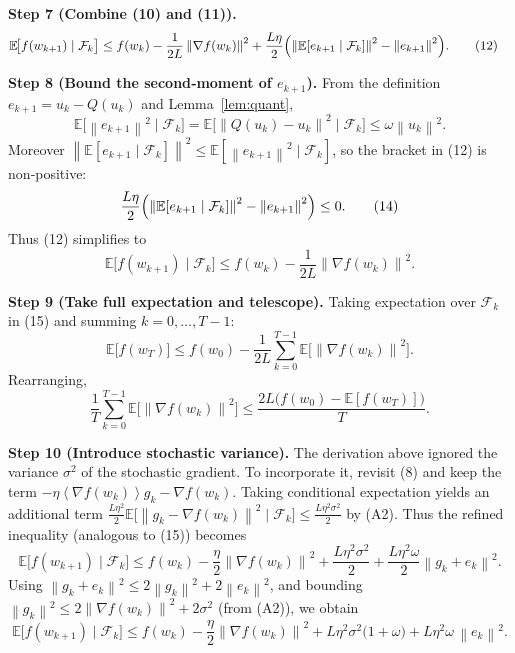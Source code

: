 \documentclass{article}
\newcommand{\E}{\mathbb{E}}
\newcommand{\norm}[1]{\left\|#1\right\|}
\newcommand{\inner}[1]{\left\langle#1\right\rangle}
\begin{document}
\bigskip
\noindent\textbf{Step 7 (Combine (10) and (11)).}
\begin{align}
\E\!\bigl[f(w_{k+1})\mid\mathcal{F}_k\bigr]
&\le f(w_k)
   -\frac{1}{2L}\norm{\nabla f(w_k)}^{2}
   +\frac{L\eta}{2}\Bigl(\norm{\E[e_{k+1}\mid\mathcal{F}_k]}^{2}
                         -\norm{e_{k+1}}^{2}\Bigr). \tag{12}
\end{align}
\noindent[Step 7]

\bigskip
\noindent\textbf{Step 8 (Bound the second‑moment of $e_{k+1}$).}  
From the definition $e_{k+1}=u_k-Q(u_k)$ and Lemma~\ref{lem:quant},
\[
\E\!\bigl[\norm{e_{k+1}}^{2}\mid\mathcal{F}_k\bigr]
   =\E\!\bigl[\norm{Q(u_k)-u_k}^{2}\mid\mathcal{F}_k\bigr]
   \le \omega\norm{u_k}^{2}. \tag{13}
\]
Moreover $\norm{\E[e_{k+1}\mid\mathcal{F}_k]}^{2}\le \E[\norm{e_{k+1}}^{2}\mid\mathcal{F}_k]$,
so the bracket in (12) is non‑positive:
\[
\frac{L\eta}{2}\Bigl(\norm{\E[e_{k+1}\mid\mathcal{F}_k]}^{2}
                         -\norm{e_{k+1}}^{2}\Bigr)
\le 0 .\tag{14}
\]
Thus (12) simplifies to
\[
\E\!\bigl[f(w_{k+1})\mid\mathcal{F}_k\bigr]
\le f(w_k)-\frac{1}{2L}\norm{\nabla f(w_k)}^{2}. \tag{15}
\]
\noindent[Step 8]

\bigskip
\noindent\textbf{Step 9 (Take full expectation and telescope).}
Taking expectation over $\mathcal{F}_k$ in (15) and summing $k=0,\dots,T-1$:
\[
\E\!\bigl[f(w_T)\bigr]
\le f(w_0)-\frac{1}{2L}\sum_{k=0}^{T-1}\E\!\bigl[\norm{\nabla f(w_k)}^{2}\bigr]. \tag{16}
\]
Rearranging,
\[
\frac{1}{T}\sum_{k=0}^{T-1}\E\!\bigl[\norm{\nabla f(w_k)}^{2}\bigr]
\le \frac{2L\bigl(f(w_0)-\E[f(w_T)]\bigr)}{T}. \tag{17}
\]

\bigskip
\noindent\textbf{Step 10 (Introduce stochastic variance).}  
The derivation above ignored the variance $\sigma^2$ of the stochastic gradient.
To incorporate it, revisit (8) and keep the term $-\eta\inner{\nabla f(w_k)}{g_k-\nabla f(w_k)}$.
Taking conditional expectation yields an additional term
$\frac{L\eta^{2}}{2}\E\!\bigl[\norm{g_k-\nabla f(w_k)}^{2}\mid\mathcal{F}_k\bigr]
\le \frac{L\eta^{2}\sigma^{2}}{2}$ by (A2).
Thus the refined inequality (analogous to (15)) becomes
\[
\E\!\bigl[f(w_{k+1})\mid\mathcal{F}_k\bigr]
\le f(w_k)-\frac{\eta}{2}\norm{\nabla f(w_k)}^{2}
      +\frac{L\eta^{2}\sigma^{2}}{2}
      +\frac{L\eta^{2}\omega}{2}\norm{g_k+e_k}^{2}. \tag{18}
\]
Using $\norm{g_k+e_k}^{2}\le 2\norm{g_k}^{2}+2\norm{e_k}^{2}$,
and bounding $\norm{g_k}^{2}\le 2\norm{\nabla f(w_k)}^{2}+2\sigma^{2}$ (from (A2)),
we obtain
\[
\E\!\bigl[f(w_{k+1})\mid\mathcal{F}_k\bigr]
\le f(w_k)-\frac{\eta}{2}\norm{\nabla f(w_k)}^{2}
      +L\eta^{2}\sigma^{2}\bigl(1+\omega\bigr)
      +L\eta^{2}\omega\,\norm{e_k}^{2}. \tag{19}
\]
\end{document}
